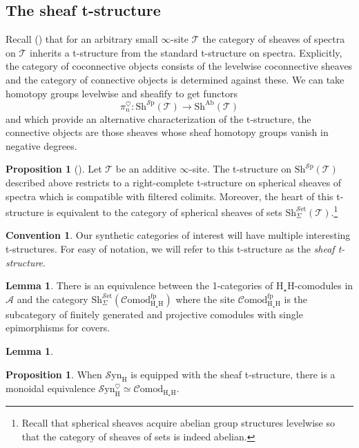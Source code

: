 \documentclass[10pt]{amsart}
\theoremstyle{definition}
\numberwithin{figure}{section}
\numberwithin{equation}{section}
\newtheorem{lemma}[figure]{Lemma}
\newtheorem{proposition}[figure]{Proposition}
\newtheorem{convention}[figure]{Convention}
\newcommand{\cA}{\mathcal{A}}
\newcommand{\cT}{\mathcal{T}}
\theoremstyle{cited}
\newcommand{\Ab}{\mathrm{Ab}}
\newcommand{\Sp}{{\mathcal{S}\mathrm{p}}}
\newcommand{\Set}{{\mathcal{S}\mathrm{et}}}
\newcommand{\Sh}{\mathrm{Sh}}
\newcommand{\fp}{\mathrm{fp}}
\newcommand{\Syn}{\mathcal{S}\mathrm{yn}}
\renewcommand{\H}{\mathrm{H}}
\newcommand{\Comod}{\mathcal{C}\mathrm{omod}}
\begin{document}
\subsection{The sheaf t-structure} 

Recall (\cite{todo}) that for an arbitrary small $\infty$-site $\cT$ the category of sheaves of spectra on $\cT$ inherits a t-structure from the standard t-structure on spectra. Explicitly, the category of coconnective objects consists of the levelwise coconnective sheaves and the category of connective objects is determined against these. We can take homotopy groups levelwise and sheafify to get functors
\[
  \pi^\heartsuit_n:\Sh^\Sp(\cT)\to \Sh^\Ab(\cT)
\]
and which provide an alternative characterization of the t-structure, the connective objects are those sheaves whose sheaf homotopy groups vanish in negative degrees. 

\begin{proposition}[\cite{Pst22}]
  Let $\cT$ be an additive $\infty$-site. The t-structure on $\Sh^\Sp(\cT)$ described above restricts to a right-complete t-structure on spherical sheaves of spectra which is compatible with filtered colimits. Moreover, the heart of this t-structure is equivalent to the category of spherical sheaves of sets $\Sh_\Sigma^\Set(\cT)$.\footnote{Recall that spherical sheaves acquire abelian group structures levelwise so that the category of sheaves of sets is indeed abelian.}
\end{proposition}

\begin{convention}
  Our synthetic categories of interest will have multiple interesting t-structures. For easy of notation, we will refer to this t-structure as the \textit{sheaf t-structure}.
\end{convention}

\begin{lemma}
  There is an equivalence between the 1-categories of $\H_\star\H$-comodules in $\cA$ and the category $\Sh^{\Set}_\Sigma(\Comod_{\H_\star \H}^\fp)$ where the site $\Comod_{\H_\star \H}^\fp$ is the subcategory of finitely generated and projective comodules with single epimorphisms for covers.
\end{lemma}

\begin{lemma}
  
\end{lemma}

\begin{proposition}
  When $\Syn_\H$ is equipped with the sheaf t-structure, there is a monoidal equivalence $\Syn_\H^\heartsuit\simeq \Comod_{\H_\star \H}$.
\end{proposition}
\end{document}

